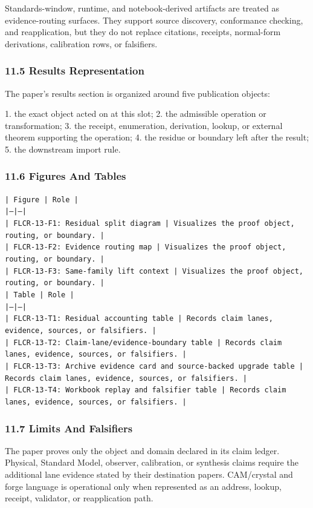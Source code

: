 \documentclass[11pt]{article}
\begin{document}
Standards-window, runtime, and notebook-derived artifacts are treated
as evidence-routing surfaces. They support source discovery, conformance
checking, and reapplication, but they do not replace citations, receipts,
normal-form derivations, calibration rows, or falsifiers.

\subsubsection*{11.5 Results Representation}

The paper's results section is organized around five publication objects:

1. the exact object acted on at this slot;
2. the admissible operation or transformation;
3. the receipt, enumeration, derivation, lookup, or external theorem supporting
   the operation;
4. the residue or boundary left after the result;
5. the downstream import rule.

\subsubsection*{11.6 Figures And Tables}

\noindent\texttt{| Figure | Role |}\\
\noindent\texttt{|---|---|}\\
\noindent\texttt{| FLCR-13-F1: Residual split diagram | Visualizes the proof object, routing, or boundary. |}\\
\noindent\texttt{| FLCR-13-F2: Evidence routing map | Visualizes the proof object, routing, or boundary. |}\\
\noindent\texttt{| FLCR-13-F3: Same-family lift context | Visualizes the proof object, routing, or boundary. |}\\

\noindent\texttt{| Table | Role |}\\
\noindent\texttt{|---|---|}\\
\noindent\texttt{| FLCR-13-T1: Residual accounting table | Records claim lanes, evidence, sources, or falsifiers. |}\\
\noindent\texttt{| FLCR-13-T2: Claim-lane/evidence-boundary table | Records claim lanes, evidence, sources, or falsifiers. |}\\
\noindent\texttt{| FLCR-13-T3: Archive evidence card and source-backed upgrade table | Records claim lanes, evidence, sources, or falsifiers. |}\\
\noindent\texttt{| FLCR-13-T4: Workbook replay and falsifier table | Records claim lanes, evidence, sources, or falsifiers. |}\\

\subsubsection*{11.7 Limits And Falsifiers}

The paper proves only the object and domain declared in its claim ledger.
Physical, Standard Model, observer, calibration, or synthesis claims require
the additional lane evidence stated by their destination papers. CAM/crystal
and forge language is operational only when represented as an address, lookup,
receipt, validator, or reapplication path.
\end{document}
